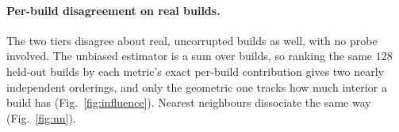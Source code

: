 \begin{table}[h]
\centering
\small
\setlength{\tabcolsep}{3.5pt}
\caption{\textbf{Kernel and preprocessing ablation.} Separations in each variant's own noise
floor (the bench estimator's expected value, so the base \vkid{} row reads $422$ where the
card's $48$-draw floor gives $444$), $n{=}256$, $399$-build reference. Gates: the geometry
ladder at $n{=}64$ and $128$; $^\ast$the render ladder at $n{=}64$.}
\label{tab:kernel}
\end{table}


\paragraph{Per-build disagreement on real builds.} The two tiers disagree about
real, uncorrupted builds as well, with no probe involved. The unbiased estimator
is a sum over builds, so ranking the same $128$ held-out builds by each metric's
exact per-build contribution gives two nearly independent orderings, and only the
geometric one tracks how much interior a build has (Fig.~\ref{fig:influence}).
Nearest neighbours dissociate the same way (Fig.~\ref{fig:nn}).

